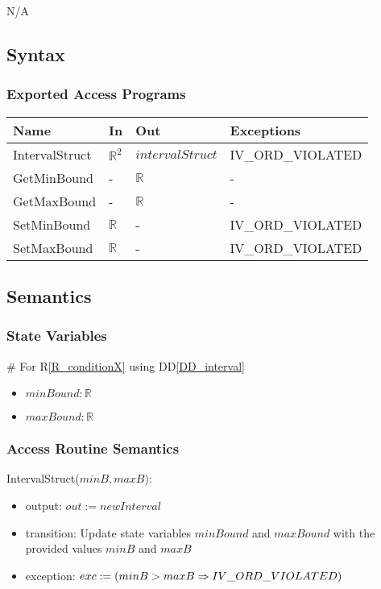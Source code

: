 \documentclass[12pt, titlepage]{article}
\newcommand{\rref}[1]{R\ref{#1}}
\newcommand{\ddref}[1]{DD\ref{#1}}
\begin{document}
N/A

\subsection{Syntax}

\subsubsection{Exported Access Programs}

\begin{center}
	\begin{tabular}{p{3cm} p{3cm} p{3cm} p{5cm}}
		\hline
		\textbf{Name} & \textbf{In} & \textbf{Out} & \textbf{Exceptions} \\
		\hline		
		IntervalStruct & $\mathbb{R}^2$ & $intervalStruct$ & IV\_ORD\_VIOLATED 
		\\
		GetMinBound & - & $\mathbb{R}$ & - \\
		GetMaxBound & - & $\mathbb{R}$ & - \\
		SetMinBound & $\mathbb{R}$ & - & IV\_ORD\_VIOLATED \\
		SetMaxBound & $\mathbb{R}$ & - & IV\_ORD\_VIOLATED \\
		\hline
	\end{tabular}
\end{center}

\subsection{Semantics}

\subsubsection{State Variables}

\# For \rref{R_conditionX} using \ddref{DD_interval}
\begin{itemize}
	\item $minBound : \mathbb{R}$
	\item $maxBound : \mathbb{R}$
\end{itemize}

\subsubsection{Access Routine Semantics}

\noindent IntervalStruct($minB, maxB$):
\begin{itemize}
	\item output: $out := newInterval$
	\item transition: Update state variables $minBound$ and $maxBound$ with the 
	provided values $minB$ and $maxB$
	\item exception: $exc := \\
	(minB > maxB \Rightarrow IV\_ORD\_VIOLATED)$
\end{itemize}
\end{document}
